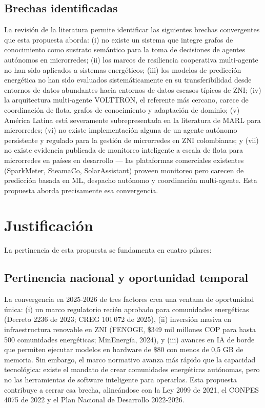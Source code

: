 \documentclass[12pt,letterpaper]{article}
\begin{document}
\subsection*{Brechas identificadas}

La revisi\'on de la literatura permite identificar las siguientes brechas convergentes que esta propuesta aborda: (i) no existe un sistema que integre grafos de conocimiento como sustrato sem\'antico para la toma de decisiones de agentes aut\'onomos en microrredes; (ii) los marcos de resiliencia cooperativa multi-agente no han sido aplicados a sistemas energ\'eticos; (iii) los modelos de predicci\'on energ\'etica no han sido evaluados sistem\'aticamente en su transferibilidad desde entornos de datos abundantes hacia entornos de datos escasos t\'ipicos de ZNI; (iv) la arquitectura multi-agente VOLTTRON, el referente m\'as cercano, carece de coordinaci\'on de flota, grafos de conocimiento y adaptaci\'on de dominio; (v) Am\'erica Latina est\'a severamente subrepresentada en la literatura de MARL para microrredes; (vi) no existe implementaci\'on alguna de un agente aut\'onomo persistente y regulado para la gesti\'on de microrredes en ZNI colombianas; y (vii) no existe evidencia publicada de monitoreo inteligente a escala de flota para microrredes en pa\'ises en desarrollo --- las plataformas comerciales existentes (SparkMeter, SteamaCo, SolarAssistant) proveen monitoreo pero carecen de predicci\'on basada en ML, despacho aut\'onomo y coordinaci\'on multi-agente. Esta propuesta aborda precisamente esa convergencia.

\section{Justificaci\'on}

La pertinencia de esta propuesta se fundamenta en cuatro pilares:

\subsection*{Pertinencia nacional y oportunidad temporal}

La convergencia en 2025-2026 de tres factores crea una ventana de oportunidad \'unica: (i) un marco regulatorio reci\'en aprobado para comunidades energ\'eticas (Decreto 2236 de 2023; CREG 101\,072 de 2025), (ii) inversi\'on masiva en infraestructura renovable en ZNI (FENOGE, \$349 mil millones COP para hasta 500 comunidades energ\'eticas; MinEnerg\'ia, 2024), y (iii) avances en IA de borde que permiten ejecutar modelos en hardware de \$80 con menos de 0,5 GB de memoria. Sin embargo, el marco normativo avanza m\'as r\'apido que la capacidad tecnol\'ogica: existe el mandato de crear comunidades energ\'eticas aut\'onomas, pero no las herramientas de software inteligente para operarlas. Esta propuesta contribuye a cerrar esa brecha, aline\'andose con la Ley 2099 de 2021, el CONPES 4075 de 2022 y el Plan Nacional de Desarrollo 2022-2026.
\end{document}
